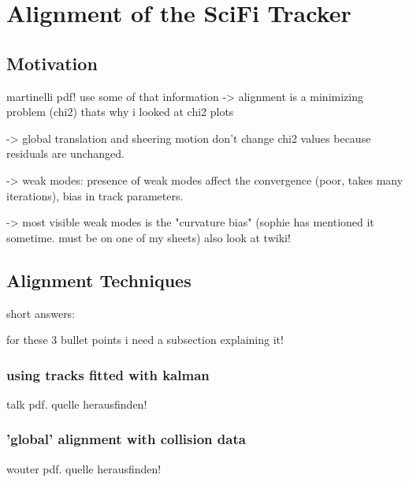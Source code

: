 
\chapter{Alignment of the SciFi Tracker}
\label{sec:alignment}
\section{Motivation}
martinelli pdf! use some of that information
-> alignment is a minimizing problem (chi2) thats why i looked at chi2 plots

-> global translation and sheering motion don't change chi2 values because residuals are unchanged.

-> weak modes: presence of weak modes affect the convergence (poor, takes many iterations), bias in track parameters.

-> most visible weak modes is the "curvature bias" (sophie has mentioned it sometime. must be on one of my sheets)
also look at twiki!
\section{Alignment Techniques}
short answers:

for these 3 bullet points i need a subsection explaining it!

\subsection{using tracks fitted with kalman}
talk pdf. quelle herausfinden!
\subsection{'global' alignment with collision data}
wouter pdf. quelle herausfinden!

